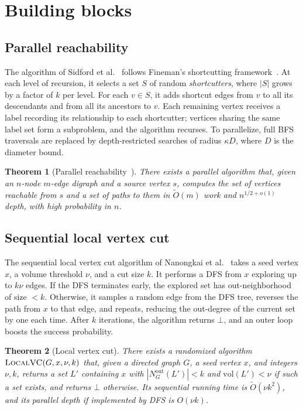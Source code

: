 \documentclass[11pt]{article}
\newtheorem{theorem}{Theorem}[section]
\theoremstyle{remark}
\newcommand{\tildeO}{\widetilde{O}}
\newcommand{\LocalVC}{\textsc{LocalVC}}
\newcommand{\bottom}{\bot}
\newcommand{\vol}{\mathrm{vol}}
\begin{document}
\section{Building blocks}

\subsection{Parallel reachability}
The algorithm of Sidford et al.~\cite{Jambulapati2019ParallelRI} follows Fineman's shortcutting framework~\cite{Fine18}. At each level of recursion, it selects a set \(S\) of random \emph{shortcutters}, where \(|S|\) grows by a factor of \(k\) per level. For each \(v\in S\), it adds shortcut edges from \(v\) to all its descendants and from all its ancestors to \(v\). Each remaining vertex receives a label recording its relationship to each shortcutter; vertices sharing the same label set form a subproblem, and the algorithm recurses. To parallelize, full BFS traversals are replaced by depth-restricted searches of radius \(\kappa D\), where \(D\) is the diameter bound. 

\begin{theorem}[Parallel reachability~\cite{Jambulapati2019ParallelRI}]
\label{thm:par-reach}
There exists a parallel algorithm that, given an \(n\)-node \(m\)-edge digraph and a source vertex \(s\), computes the set of vertices reachable from \(s\) and a set of paths to them in \(\tildeO(m)\) work and \(n^{1/2+o(1)}\) depth, with high probability in \(n\).
\end{theorem}

\subsection{Sequential local vertex cut}
The sequential local vertex cut algorithm of Nanongkai et al.~\cite{nanongkai2021breakingquadratictimesmall} takes a seed vertex \(x\), a volume threshold \(\nu\), and a cut size \(k\). It performs a DFS from \(x\) exploring up to \(k\nu\) edges. If the DFS terminates early, the explored set has out-neighborhood of size \(<k\). Otherwise, it samples a random edge from the DFS tree, reverses the path from \(x\) to that edge, and repeats, reducing the out-degree of the current set by one each time. After \(k\) iterations, the algorithm returns \(\bottom\), and an outer loop boosts the success probability.

\begin{theorem}[Local vertex cut]
\label{thm:local-vc}
There exists a randomized algorithm \(\LocalVC(G,x,\nu,k)\) that, given a directed graph \(G\), a seed vertex \(x\), and integers \(\nu,k\), returns a set \(L'\) containing \(x\) with \(|N_G^{\mathrm{out}}(L')|<k\) and \(\vol(L')<\nu\) if such a set exists, and returns \(\bottom\) otherwise. Its sequential running time is \(\tildeO(\nu k^2)\), and its parallel depth if implemented by DFS is \(O(\nu k)\).
\end{theorem}
\end{document}
